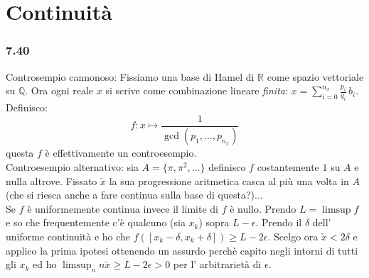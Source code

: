 \documentclass[a4paper,11pt]{article}
\newcommand{\ex}[1]{\subsubsection*{#1}}
\newcommand{\QQ}{\mathbb{Q}}
\newcommand{\RR}{\mathbb{R}}
\begin{document}
\section{Continuità}
\ex{7.40}Controsempio cannonoso: Fissiamo una base di Hamel di $\RR$ come spazio vettoriale su $\QQ$. Ora ogni reale $x$ si scrive come combinazione lineare {\it finita}: $x=\sum_{i=0}^{n_x} \frac{p_i}{q_i}\, b_i$. Definisco:
$$
f:x\mapsto \frac{1}{\gcd(p_1,\ldots,p_{n_x})}
$$ 
questa $f$ è effettivamente un controesempio.\\
Controesempio alternativo: sia $A=\{\pi,\pi^2,\ldots\}$ definisco $f$ costantemente $1$ su $A$ e nulla altrove. Fissato $\check{x}$ la sua progressione aritmetica casca al più una volta in $A$ (che si riesca anche a fare continua sulla base di questa?)...\\
Se $f$ è uniformemente continua invece il limite di $f$ è nullo. Prendo $L=\limsup f$ e so che frequentemente c'è qualcuno (sia $x_k$) sopra $L-\epsilon$. Prendo il $\delta$ dell' uniforme continuità e ho che $f([x_k-\delta,x_k+\delta])\ge L-2\epsilon$. Scelgo ora $\check{x}<2\delta$ e applico la prima ipotesi ottenendo un assurdo perchè capito negli intorni di tutti gli $x_k$ ed ho $\limsup_n n\check{x}\ge L-2\epsilon>0$ per l' arbitrarietà di $\epsilon$.
 
\end{document}
